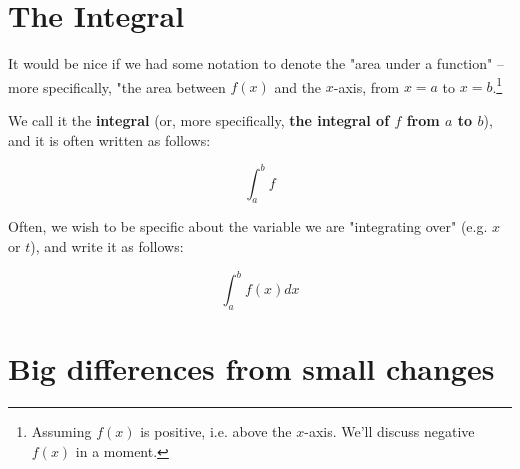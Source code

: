 \documentclass{article}
\begin{document}



\section{The Integral}

It would be nice if we had some notation to denote the "area under a function" -- more specifically, "the area between $f(x)$ and the $x$-axis, from $x = a$ to $x = b$.\footnote{Assuming $f(x)$ is positive, i.e. above the $x$-axis. We'll discuss negative $f(x)$ in a moment.} 


We call it the \textbf{integral} (or, more specifically, \textbf{the integral of $f$ from $a$ to $b$}), and it is often written as follows:

\begin{equation}
\int_{a}^{b} f
\end{equation}

Often, we wish to be specific about the variable we are "integrating over" (e.g. $x$ or $t$), and write it as follows:

\begin{equation}
\int_{a}^{b} f(x) dx
\end{equation}










\section{Big differences from small changes}


\end{document}
